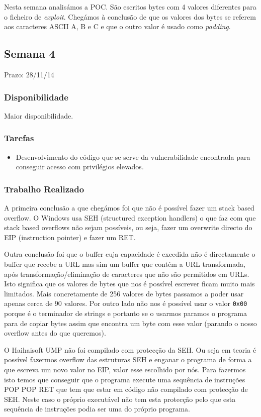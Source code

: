 \documentclass[a4paper]{article}
\begin{document}
Nesta semana analisámos a POC. São escritos bytes com 4 valores diferentes para o ficheiro de \textit{exploit}. Chegámos à conclusão de que os valores dos bytes se referem aos caracteres ASCII A, B e C e que o outro valor é usado como \textit{padding}.

\subsection{Semana 4}
Prazo: 28/11/14
\subsubsection{Disponibilidade}
Maior disponibilidade.
\subsubsection{Tarefas}
\begin{itemize}
	\item Desenvolvimento do código que se serve da vulnerabilidade encontrada para conseguir acesso com privilégios elevados.
\end{itemize}

\subsubsection{Trabalho Realizado}
A primeira conclusão a que chegámos foi que não é possível fazer um stack based overflow. O Windows usa SEH (structured exception handlers) o que faz com que stack based overflows não sejam possíveis, ou seja, fazer um overwrite directo do EIP (instruction pointer) e fazer um RET.

Outra conclusão foi que o buffer cuja capacidade é excedida não é directamente o buffer que recebe a URL mas sim um buffer que contém a URL transformada, após transformação/eliminação de caracteres que não são permitidos em URLs. Isto significa que os valores de bytes que nos é possível escrever ficam muito mais limitados. Mais concretamente de 256 valores de bytes passamos a poder usar apenas cerca de 90 valores. Por outro lado não nos é possível usar o valor \texttt{0x00} porque é o terminador de strings e portanto se o usarmos paramos o programa para de copiar bytes assim que encontra um byte com esse valor (parando o nosso overflow antes do que queremos).

O Haihaisoft UMP não foi compilado com protecção da SEH. Ou seja em teoria é possível fazermos overflow das estruturas SEH e enganar o programa de forma a que escreva um novo valor no EIP, valor esse escolhido por nós. Para fazermos isto temos que conseguir que o programa execute uma sequência de instruções POP POP RET que tem que estar em código não compilado com protecção de SEH. Neste caso o próprio executável não tem esta protecção pelo que esta sequência de instruções podia ser uma do próprio programa.
\end{document}
